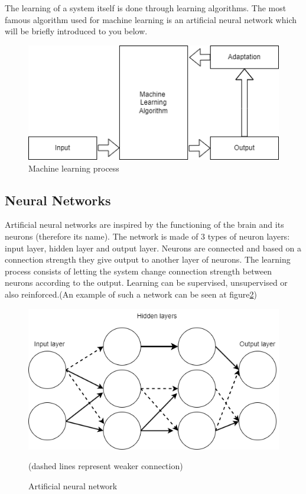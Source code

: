 \documentclass[10pt,a4paper]{article}
\begin{document}
The learning of a system itself is done through learning algorithms. The most famous algorithm used for machine learning is an artificial neural network which will be briefly introduced to you below. 

\begin{figure}[h]
\center
\includegraphics[scale=0.5]{diagram1.png}
\caption{Machine learning process}
\label{Diagram 1}
\end{figure}

\subsection{Neural Networks} 
Artificial neural networks \cite{zou2009overview} are inspired by the functioning of the brain and its neurons (therefore its name).  The network is made of 3 types of neuron layers: input layer, hidden layer and output layer. Neurons are connected and based on a connection strength they give output to another layer of neurons. The learning process consists of letting the system change connection strength between neurons according to the output. Learning can be supervised, unsupervised or also reinforced.(An example of such a network can be seen at figure\ref{Diagram 2})

\begin{figure}[h]
\center
\includegraphics[scale=0.45]{diagram2.png}
\caption{Artificial neural network}
\label{Diagram 2}
(dashed lines represent weaker connection)
\end{figure}
\end{document}
